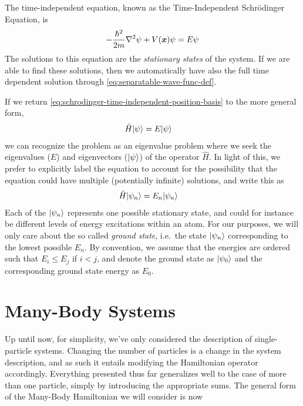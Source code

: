 \documentclass[Thesis.tex]{subfiles}
\begin{document}
The time-independent equation, known as the Time-Independent Schrödinger Equation, is
\begin{align}
    - \frac{\hbar^2}{2m} \laplacian\psi + V(\vb x)\psi =
    E\psi\label{eq:schrodinger-time-independent-position-basis}
\end{align}
The solutions to this equation are the \emph{stationary states} of the system. If
we are able to find these solutions, then we automatically have also the full time
dependent solution through \autoref{eq:separatable-wave-func-def}.

If we return \autoref{eq:schrodinger-time-independent-position-basis} to the more general
form,
\begin{align}
    \hat H | \psi \rangle &= E| \psi \rangle
\end{align}
we can recognize the problem as an eigenvalue problem where we seek the eigenvalues ($E$)
and eigenvectors ($| \psi \rangle$) of the operator $\hat H$. In light of this, we prefer to
explicitly label the equation to account for the possibility that the equation could have
multiple (potentially infinite) solutions, and write this as
\begin{align}
    \hat H| \psi_n \rangle &= E_n| \psi_n \rangle
\end{align}
Each of the $| \psi_n \rangle$ represents one possible stationary state, and could for instance be
different levels of energy excitations within an atom. For our purposes, we will only care
about the so called \emph{ground state}, i.e.\ the state $| \psi_n \rangle$ corresponding to the
lowest possible $E_n$. By convention, we assume that the energies are ordered such that $E_i
\leq E_j$ if $i < j$, and denote the ground state as $| \psi_0 \rangle$ and the corresponding ground
state energy as $E_0$.


\section{Many-Body Systems}

Up until now, for simplicity, we've only considered the description of single-particle
systems. Changing the number of particles is a change in the system description, and as
such it entails modifying the Hamiltonian operator accordingly. Everything presented thus
far generalizes well to the case of more than one particle, simply by introducing the
appropriate sums. The general form of the Many-Body Hamiltonian we will consider is now
\end{document}
